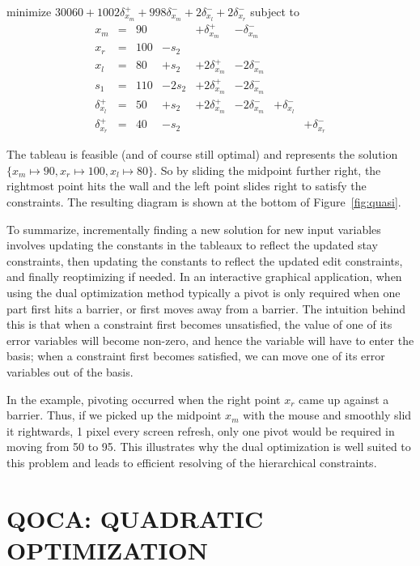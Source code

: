 \documentclass{uist96}
\begin{document}
\begin{trivlist}\item
minimize $30060 + 1002 \delta_{x_m}^+ + 998 \delta_{x_m}^-  + 2
\delta_{x_l}^- + 2\delta_{x_r}^- $ 
subject to 
$$
\begin{array}{rlrrrrrr} 
x_m & = &90 & & + \delta_{x_m}^+ & - \delta_{x_m}^- \\
x_r & = &100 & - s_2 \\ \hline
x_l & = & 80 & + s_2 & + 2 \delta_{x_m}^+ & - 2 \delta_{x_m}^- \\
s_1 & = &110 & - 2 s_2 & + 2 \delta_{x_m}^+ & - 2\delta_{x_m}^- \\
\delta_{x_l}^+ & = & 50 & + s_2 & + 2 \delta_{x_m}^+ & - 2\delta_{x_m}^- &
		+ \delta_{x_l}^- \\
\delta_{x_r}^+ & = & 40 & - s_2 &&&&  +\delta_{x_r}^-
\end{array}
$$
\end{trivlist}
The tableau is feasible (and of course still
optimal) and represents the solution
$\{x_m \mapsto 90, x_r \mapsto 100, x_l \mapsto 80\}$\@.
So by sliding the midpoint further right, the rightmost point hits the wall
and the left point slides right to satisfy the constraints.
The resulting diagram is shown at the bottom of Figure~\ref{fig:quasi}.

To summarize, incrementally finding a new solution for new input variables
involves updating the constants in the tableaux to reflect the updated stay
constraints, then updating the constants to reflect the updated edit
constraints, and finally reoptimizing if needed.  In an interactive
graphical application, when using the dual optimization method typically a
pivot is only required when one part first hits a barrier, or first moves
away from a barrier.  The intuition behind this is that
when a constraint
first becomes unsatisfied, the value of one of its error variables will
become non-zero, and hence the variable will have to enter the basis;
when a constraint first becomes satisfied,
we can move one of its error variables out of the basis.

In the example, pivoting occurred when the right point $x_r$ came up against a
barrier.  Thus, if we picked up the midpoint $x_m$ with the mouse and
smoothly slid it rightwards, 1 pixel every screen refresh, only one pivot
would be required in moving from 50 to 95.  This illustrates why the dual
optimization is well suited to this problem and leads to efficient
resolving of the hierarchical constraints.

\section{QOCA: QUADRATIC OPTIMIZATION}
\label{quadratic}
\end{document}
